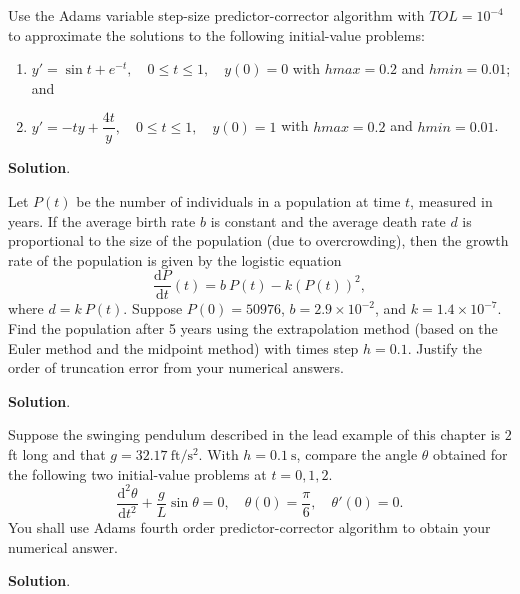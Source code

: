 \documentclass[11pt]{article}
\theoremstyle{break}
\newcommand{\dd}{\text{d}}
\numberwithin{equation}{theorem}
\begin{document}
\newpage
\begin{problem}\label{problem 13} %
    Use the Adams variable step-size predictor-corrector algorithm with $TOL = 10^{-4}$ to approximate the solutions to the following initial-value problems:
    \begin{enumerate}
        \item $y'=\sin t+e^{-t}, \quad 0\leq t\leq 1, \quad y(0)=0$ with $hmax=0.2$ and $hmin=0.01$; and
        \item $y'=-ty+\dfrac{4t}{y}, \quad 0\leq t\leq 1, \quad y(0)=1$ with $hmax=0.2$ and $hmin=0.01$.
    \end{enumerate}
\end{problem}
\textbf{Solution}. 


\newpage
\begin{problem}\label{problem 14} %
    Let $P(t)$ be the number of individuals in a population at time $t$, measured in years. If the average birth rate $b$ is constant and the average death rate $d$ is proportional to the size of the population (due to overcrowding), then the growth rate of the population is given by the logistic equation $$\dfrac{\dd P}{\dd t}(t)=b\:P(t)-k(P(t))^2,$$ where $d=k\:P(t)$. Suppose $P(0)=50976$, $b=2.9\times10^{-2}$, and $k=1.4\times 10^{-7}$. Find the population after 5 years using the extrapolation method (based on the Euler method and the midpoint method) with times step $h=0.1$. Justify the order of truncation error from your numerical answers.
\end{problem}
\textbf{Solution}. 


\newpage
\begin{problem}\label{problem 15} %
    Suppose the swinging pendulum described in the lead example of this chapter is $2$ ft long and that $g = 32.17\ \text{ft}/\text{s}^2$. With $h = 0.1\ \text{s}$, compare the angle $\theta$ obtained for the following two initial-value problems at $t = 0, 1, 2$. $$\dfrac{\dd^2\theta}{\dd t^2}+\dfrac{g}{L}\sin\theta=0, \quad \theta(0)=\dfrac{\pi}{6},\quad \theta'(0)=0.$$ You shall use Adams fourth order predictor-corrector algorithm to obtain your numerical answer.
\end{problem}
\textbf{Solution}. 
\end{document}
